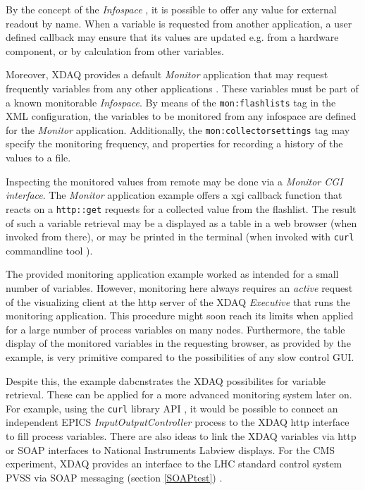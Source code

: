 By the concept of the {\em Infospace} \cite{XDAQ-wiki}, it is possible to offer any value
for external readout by name. When a variable is requested from another
application, a user defined callback may ensure that its values are updated e.g. 
from a hardware component, or by calculation from other variables.

Moreover, XDAQ provides a default  {\em Monitor} application that may
request frequently variables from any other applications \cite{XDAQ-Monitor-wiki}. These variables
must be part of a known monitorable {\em Infospace}. 
By means of the {\tt mon:flashlists} tag in the XML configuration,
the variables to be monitored from any infospace are defined for
the {\em Monitor} application. Additionally, the {\tt mon:collectorsettings}
tag may specify the monitoring frequency, and properties for
recording a history of the values to a file.

Inspecting the monitored values from remote may be done via
a {\em Monitor CGI interface}. The {\em Monitor} application
example offers a xgi callback function that reacts on
a {\tt http::get} requests for a collected value from the flashlist. 
The result of such a variable retrieval may be a displayed as a table
in a web browser (when invoked from there), or may be printed
in the terminal (when invoked with {\tt curl} commandline tool \cite{CURL}).

The provided monitoring application example worked as intended for a small number of variables.
However, monitoring here always requires an {\em active} request of the visualizing client 
at the http server of the XDAQ {\em Executive} that runs the monitoring application.
This procedure might soon reach its limits when applied for a large number of
process variables on many nodes. Furthermore, the table 
display of the monitored variables in the requesting browser, as provided by the example, 
is very primitive compared to the possibilities of any slow control GUI.

Despite this, the example dabcnstrates the XDAQ possibilites for variable retrieval.
These can be applied for a more advanced monitoring system later on. For example, 
using the {\tt curl} library API \cite{CURL}, it would be possible to connect an independent EPICS 
{\em InputOutputController} process to the XDAQ http interface to fill process variables.
There are also ideas \cite{XDAQ-Monitor-wiki} to link the XDAQ variables via http or SOAP interfaces to National Instruments Labview  \cite{Labview} displays.
For the CMS experiment, XDAQ provides an interface to the LHC 
standard control system PVSS via SOAP messaging (section \ref{SOAPtest}) \cite{XDAQ-wiki}.



